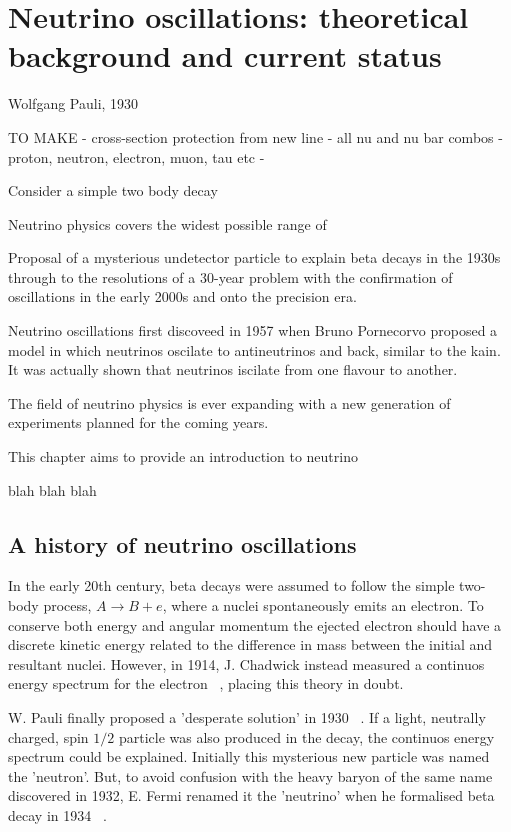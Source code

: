 \chapter{Neutrino oscillations: theoretical background and current status}
\label{chap:theory}

{Wolfgang Pauli, 1930}


TO MAKE
    - cross-section protection from new line
    - all nu and nu bar combos
    - proton, neutron, electron, muon, tau etc
    - 

Consider a simple two body decay 

Neutrino physics covers the widest possible range of 

Proposal of a mysterious undetector particle to explain beta decays in the 1930s through to the resolutions of a 30-year problem with the confirmation of oscillations in the early 2000s and onto the precision era.

Neutrino oscillations first discoveed in 1957 when Bruno Pornecorvo proposed a model in which neutrinos oscilate to antineutrinos and back, similar to the kain. It was actually shown that neutrinos iscilate from one flavour to another.


The field of neutrino physics is ever expanding with a new generation of experiments planned for the coming years. 

This chapter aims to provide an introduction to neutrino 

blah blah blah

\section{A history of neutrino oscillations}
\label{sec:theoryhistory}

In the early 20th century, beta decays were assumed to follow the simple two-body process, $A \rightarrow B + e$, where a
nuclei spontaneously emits an electron. To conserve both energy and angular momentum the ejected electron should have a discrete 
kinetic energy related to the difference in mass between the initial and resultant nuclei. However, in 1914, J. Chadwick 
instead measured a continuos energy spectrum for the electron ~\cite{chadwick1914}, placing this theory in doubt.

W. Pauli finally proposed a 'desperate solution' in 1930 ~\cite{pauli1930}. If a light, neutrally charged, spin $1/2$ particle
was also produced in the decay, the continuos energy spectrum could be explained. Initially this mysterious new particle was
named the 'neutron'. But, to avoid confusion with the heavy baryon of the same name discovered in 1932, E. Fermi renamed it 
the 'neutrino' when he formalised beta decay in 1934 ~\cite{fermi1934}.

